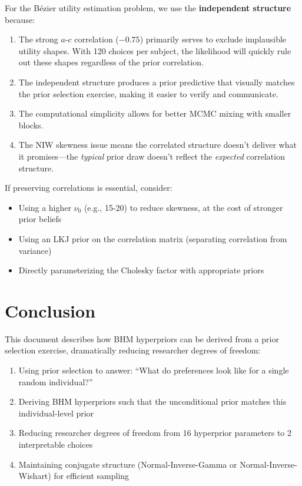 \documentclass[11pt]{article}
\begin{document}
For the Bézier utility estimation problem, we use the \textbf{independent structure} because:

\begin{enumerate}
  \item The strong $a$-$c$ correlation ($-0.75$) primarily serves to exclude implausible utility shapes. With 120 choices per subject, the likelihood will quickly rule out these shapes regardless of the prior correlation.

  \item The independent structure produces a prior predictive that visually matches the prior selection exercise, making it easier to verify and communicate.

  \item The computational simplicity allows for better MCMC mixing with smaller blocks.

  \item The NIW skewness issue means the correlated structure doesn't deliver what it promises---the \textit{typical} prior draw doesn't reflect the \textit{expected} correlation structure.
\end{enumerate}

If preserving correlations is essential, consider:
\begin{itemize}
  \item Using a higher $\nu_0$ (e.g., 15-20) to reduce skewness, at the cost of stronger prior beliefs
  \item Using an LKJ prior on the correlation matrix (separating correlation from variance)
  \item Directly parameterizing the Cholesky factor with appropriate priors
\end{itemize}

\section{Conclusion}

This document describes how BHM hyperpriors can be derived from a prior selection exercise, dramatically reducing researcher degrees of freedom:
\begin{enumerate}
  \item Using prior selection to answer: ``What do preferences look like for a single random individual?''
  \item Deriving BHM hyperpriors such that the unconditional prior matches this individual-level prior
  \item Reducing researcher degrees of freedom from 16 hyperprior parameters to 2 interpretable choices
  \item Maintaining conjugate structure (Normal-Inverse-Gamma or Normal-Inverse-Wishart) for efficient sampling
\end{enumerate}
\end{document}
